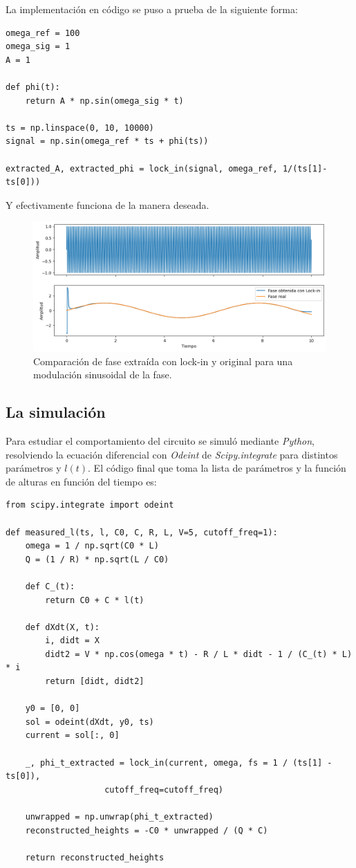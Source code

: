 La implementación en código se puso a prueba de la siguiente forma:

\begin{lstlisting}
omega_ref = 100
omega_sig = 1
A = 1
	
def phi(t):
	return A * np.sin(omega_sig * t)
	
ts = np.linspace(0, 10, 10000)
signal = np.sin(omega_ref * ts + phi(ts))
	
extracted_A, extracted_phi = lock_in(signal, omega_ref, 1/(ts[1]-ts[0]))
\end{lstlisting}

Y efectivamente funciona de la manera deseada.

\begin{figure}[!ht]
	\centering
	\includegraphics[width=0.9\linewidth]{Figures/31_04_2025/Lock_in}
	\caption{Comparación de fase extraída con lock-in y original para una modulación sinusoidal de la fase.}
	\label{fig:lockin}
\end{figure}


\subsection*{La simulación}
Para estudiar el comportamiento del circuito se simuló mediante \textit{Python}, resolviendo la ecuación diferencial con \textit{Odeint} de \textit{Scipy.integrate} para distintos parámetros y $l(t)$. El código final que toma la lista de parámetros y la función de alturas en función del tiempo es:

\begin{lstlisting}
from scipy.integrate import odeint
	
def measured_l(ts, l, C0, C, R, L, V=5, cutoff_freq=1):
	omega = 1 / np.sqrt(C0 * L)
	Q = (1 / R) * np.sqrt(L / C0)
	
	def C_(t):
		return C0 + C * l(t)
	
	def dXdt(X, t):
		i, didt = X
		didt2 = V * np.cos(omega * t) - R / L * didt - 1 / (C_(t) * L) * i
		return [didt, didt2]
	
	y0 = [0, 0]
	sol = odeint(dXdt, y0, ts)
	current = sol[:, 0]  
	
	_, phi_t_extracted = lock_in(current, omega, fs = 1 / (ts[1] - ts[0]), 
				    cutoff_freq=cutoff_freq)
	
	unwrapped = np.unwrap(phi_t_extracted)
	reconstructed_heights = -C0 * unwrapped / (Q * C)
	
	return reconstructed_heights
\end{lstlisting}

